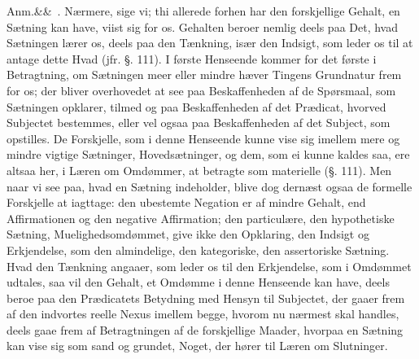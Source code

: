 \documentclass[12pt]{book}
\def\sperr#1{#1}%
\def\textit#1{#1}%
\def\emph#1{#1}%
\newcommand{\sperr}[1]{\textls[180]{#1}}
\newcommand{\anm}[1]{%
  \par\vspace{0.5\baselineskip}%
  \noindent\hspace{\parindent}\sperr{Anm.}\ifx&#1&\else~\textit{#1}.\fi
  \enspace\ignorespaces
}
\newcommand{\opage}[1]{\marginnote{\footnotesize\textit{[#1]}}}
\begin{document}
\anm{} \emph{Nærmere}, sige vi; thi allerede forhen har den forskjellige
Gehalt, en Sætning kan have, viist sig for os. Gehalten beroer nemlig deels paa
Det, hvad Sætningen lærer os, deels paa den Tænkning, især den Indsigt, som
leder os til at antage dette Hvad (jfr. §. 111). I første Henseende kommer for
det første i Betragtning, om Sætningen meer eller mindre hæver Tingens
Grundnatur frem for os; der bliver overhovedet at see paa Beskaffenheden af de
Spørsmaal, som Sætningen opklarer, tilmed og paa Beskaffenheden af det
Prædicat, hvorved Subjectet bestemmes, eller vel ogsaa paa Beskaffenheden af
det Subject, som opstilles. De Forskjelle, som i denne Henseende kunne vise sig
imellem mere og mindre vigtige Sætninger, Hovedsætninger, og dem, som ei kunne
kaldes saa, ere altsaa her, i Læren om Omdømmer, at betragte som
\emph{materielle} (§. 111). Men naar vi see paa, hvad en Sætning indeholder,
blive dog dernæst ogsaa de \emph{formelle} Forskjelle at iagttage: den
ubestemte Negation er af mindre Gehalt, end Affirmationen og den negative
Affirmation;
\opage{300} %
den particulære, den hypothetiske Sætning, Muelighedsomdømmet, give ikke den
Opklaring, den Indsigt og Erkjendelse, som den almindelige, den kategoriske, den
assertoriske Sætning. Hvad den Tænkning angaaer, som leder os til den
Erkjendelse, som i Omdømmet udtales, saa vil den Gehalt, et Omdømme i denne
Henseende kan have, deels beroe paa den Prædicatets Betydning med Hensyn til
Subjectet, der gaaer frem af den indvortes reelle Nexus imellem begge, hvorom nu
nærmest skal handles, deels gaae frem af Betragtningen af de forskjellige
Maader, hvorpaa en Sætning kan vise sig som sand og grundet, Noget, der hører
til Læren om Slutninger.
\end{document}
